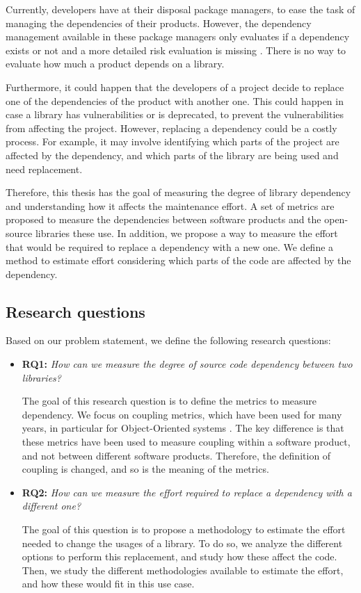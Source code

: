 \documentclass[a4paper]{article}
\begin{document}
Currently, developers have at their disposal package managers, to ease the task of managing the dependencies of their products. However, the dependency management available in these package managers only evaluates if a dependency exists or not and a more detailed risk evaluation is missing \cite{hejderup2018prazi}. There is no way to evaluate how much a product depends on a library.

Furthermore, it could happen that the developers of a project decide to replace one of the dependencies of the product with another one. This could happen in case a library has vulnerabilities or is deprecated, to prevent the vulnerabilities from affecting the project. However, replacing a dependency could be a costly process. For example, it may involve identifying which parts of the project are affected by the dependency, and which parts of the library are being used and need replacement.

Therefore, this thesis has the goal of measuring the degree of library dependency and understanding how it affects the maintenance effort. A set of metrics are proposed to measure the dependencies between software products and the open-source libraries these use. In addition, we propose a way to measure the effort that would be required to replace a dependency with a new one. We define a method to estimate effort considering which parts of the code are affected by the dependency.

\subsection{Research questions}
Based on our problem statement, we define the following research questions:

\begin{itemize}
  \item \textbf{RQ1:} \textit{How can we measure the degree of source code dependency between two libraries?}

  The goal of this research question is to define the metrics to measure dependency. We focus on coupling metrics, which have been used for many years, in particular for Object-Oriented systems \cite{briand1999unified}. The key difference is that these metrics have been used to measure coupling within a software product, and not between different software products. Therefore, the definition of coupling is changed, and so is the meaning of the metrics.

  \item \textbf{RQ2:} \textit{How can we measure the effort required to replace a dependency with a different one?}

  The goal of this question is to propose a methodology to estimate the effort needed to change the usages of a library. To do so, we analyze the different options to perform this replacement, and study how these affect the code. Then, we study the different methodologies available to estimate the effort, and how these would fit in this use case.
\end{itemize}
\end{document}
